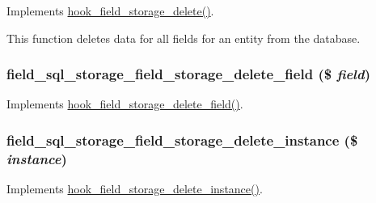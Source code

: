 \label{field__sql__storage_8module_a7a0c84776ec288e40108b28829288983}
Implements \hyperlink{group__field__storage_ga64bd5adc0e4ccc1fe52fbaabcfa10274}{hook\_\-field\_\-storage\_\-delete()}.

This function deletes data for all fields for an entity from the database. \hypertarget{field__sql__storage_8module_a7c690572c051b48b3ced474ed7852069}{
\subsubsection[{field\_\-sql\_\-storage\_\-field\_\-storage\_\-delete\_\-field}]{\setlength{\rightskip}{0pt plus 5cm}field\_\-sql\_\-storage\_\-field\_\-storage\_\-delete\_\-field (\$ {\em field})}}
\label{field__sql__storage_8module_a7c690572c051b48b3ced474ed7852069}
Implements \hyperlink{group__field__storage_ga2102841b167285acf3f0e4e9f854440d}{hook\_\-field\_\-storage\_\-delete\_\-field()}. \hypertarget{field__sql__storage_8module_a0646a22038721ad2583c98c9d4ce0389}{
\subsubsection[{field\_\-sql\_\-storage\_\-field\_\-storage\_\-delete\_\-instance}]{\setlength{\rightskip}{0pt plus 5cm}field\_\-sql\_\-storage\_\-field\_\-storage\_\-delete\_\-instance (\$ {\em instance})}}
\label{field__sql__storage_8module_a0646a22038721ad2583c98c9d4ce0389}
Implements \hyperlink{group__field__storage_ga509e10cbd2900c13ab7269f1740a36f7}{hook\_\-field\_\-storage\_\-delete\_\-instance()}.

